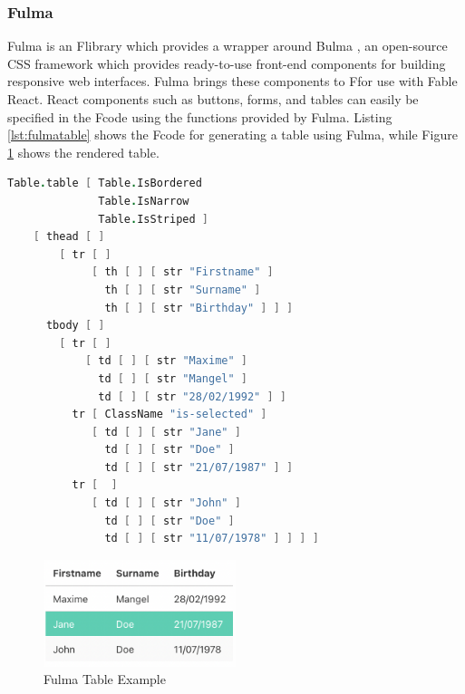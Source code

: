 \subsubsection{Fulma} \label{subsec:fulma}
Fulma \cite{fulmaio} is an F\fsharp library which provides a wrapper around Bulma \cite{bulmaio}, an open-source CSS framework which provides ready-to-use front-end components for building responsive web interfaces. Fulma brings these components to F\fsharp for use with Fable React. React components such as buttons, forms, and tables can easily be specified in the F\fsharp code using the functions provided by Fulma. Listing \ref{lst:fulmatable} shows the F\fsharp code for generating a table using Fulma, while Figure \ref{fig:fulmatable} shows the rendered table.

\begin{lstlisting}[language=FSharp, caption={Simple F\fsharp code for generating a table with Fulma \cite{fulmatable}}, captionpos=b, label={lst:fulmatable}]
    Table.table [ Table.IsBordered
              Table.IsNarrow
              Table.IsStriped ]
    [ thead [ ]
        [ tr [ ]
             [ th [ ] [ str "Firstname" ]
               th [ ] [ str "Surname" ]
               th [ ] [ str "Birthday" ] ] ]
      tbody [ ]
        [ tr [ ]
            [ td [ ] [ str "Maxime" ]
              td [ ] [ str "Mangel" ]
              td [ ] [ str "28/02/1992" ] ]
          tr [ ClassName "is-selected" ]
             [ td [ ] [ str "Jane" ]
               td [ ] [ str "Doe" ]
               td [ ] [ str "21/07/1987" ] ]
          tr [  ]
             [ td [ ] [ str "John" ]
               td [ ] [ str "Doe" ]
               td [ ] [ str "11/07/1978" ] ] ] ]
\end{lstlisting}

\begin{figure} [h]
    \centering
    \includegraphics[width=0.5\textwidth]{02.Background/Fulma Table.png}
    \caption{Fulma Table Example}
    \label{fig:fulmatable}
\end{figure}


